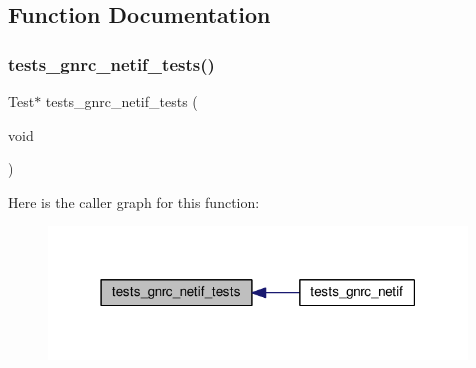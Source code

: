 \subsection{Function Documentation}
\mbox{\label{tests-gnrc__netif_8c_a56f48a394cafcdce886fa35034e9a6ae}} 
\subsubsection{\texorpdfstring{tests\+\_\+gnrc\+\_\+netif\+\_\+tests()}{tests\_gnrc\_netif\_tests()}}
{\footnotesize\ttfamily Test$\ast$ tests\+\_\+gnrc\+\_\+netif\+\_\+tests (\begin{DoxyParamCaption}\item[{void}]{ }\end{DoxyParamCaption})}

Here is the caller graph for this function\+:
\nopagebreak
\begin{figure}[H]
\begin{center}
\leavevmode
\includegraphics[width=315pt]{tests-gnrc__netif_8c_a56f48a394cafcdce886fa35034e9a6ae_icgraph}
\end{center}
\end{figure}
